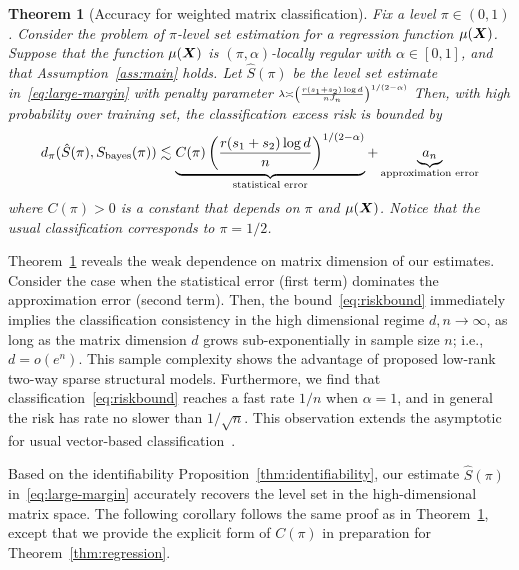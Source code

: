 \documentclass[11pt]{article}
\newcommand*{\KeepStyleUnderBrace}[1]{%
\mathop{%
\mathchoice
{\underbrace{\displaystyle#1}}%
{\underbrace{\textstyle#1}}%
{\underbrace{\scriptstyle#1}}%
{\underbrace{\scriptscriptstyle#1}}%
}\limits
}
\theoremstyle{plain}
\newtheorem{thm}{Theorem}
\theoremstyle{definition}
\def\bayesS{S_{\textup{bayes}}}
\begin{document}
\begin{thm}[Accuracy for weighted matrix classification]\label{thm:main} Fix a level $\pi\in(0,1)$. Consider the problem of $\pi$-level set estimation for a regression function $\mu(\bm X)$. Suppose that the function $\mu(\bm X)$ is $(\pi,\alpha)$-locally regular with $\alpha\in[0,1]$, and that Assumption~\ref{ass:main} holds. Let $\hat S(\pi)$ be the level set estimate in~\eqref{eq:large-margin} with penalty parameter $\scriptstyle\lambda\asymp \left( r( s_1+s_2)\log d \over  nJ_n\right)^{1/(2-\alpha)}$ Then, with high probability over training set, the classification excess risk is bounded by 
\begin{equation}\label{eq:riskbound}
d_\pi(\hat S(\pi),\bayesS(\pi)) \lesssim \KeepStyleUnderBrace{C(\pi)\left({r(s_1+s_2)\log d \over n}\right)^{1/(2-\alpha)}}_{\text{statistical error}}+ \KeepStyleUnderBrace{a_n}_{\text{approximation error}}
\end{equation}
where $C(\pi)>0$ is a constant that depends on $\pi$ and $\mu(\bm X)$. Notice that the usual classification corresponds to $\pi = 1/2$. 
\end{thm}
Theorem~\ref{thm:main} reveals the weak dependence on matrix dimension of our estimates. Consider the case when the statistical error (first term) dominates the approximation error (second term). Then, the bound~\eqref{eq:riskbound} immediately implies the classification consistency in the high dimensional regime $d,n\to \infty$, as long as the matrix dimension $d$ grows sub-exponentially in sample size $n$; i.e., $d=o(e^n)$. This sample complexity shows the advantage of proposed low-rank two-way sparse structural models. Furthermore, we find that classification~\eqref{eq:riskbound} reaches a fast rate $1/n$ when $\alpha=1$, and in general the risk has rate no slower than $1/\sqrt{n}$. This observation extends the asymptotic for usual vector-based classification~\citep{tsybakov2004optimal,shen2006discussion,audibert2007fast}. 

Based on the identifiability Proposition~\ref{thm:identifiability}, our estimate $\hat S(\pi)$ in~\eqref{eq:large-margin} accurately recovers the level set in the high-dimensional matrix space. The following corollary follows the same proof as in Theorem~\ref{thm:main}, except that we provide the explicit form of $C(\pi)$ in preparation for Theorem~\ref{thm:regression}.
\end{document}
